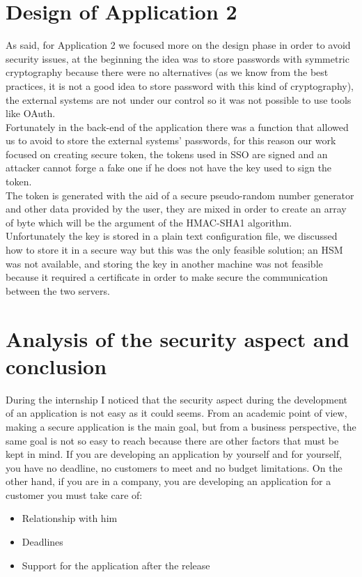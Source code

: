 \section{Design of Application 2}
As said, for Application 2 we focused more on the design phase in order to avoid security issues, at the beginning the idea was to
store passwords with symmetric cryptography because there were no alternatives (as we know from the best practices, it is not a good idea to store password with this kind of cryptography), the external systems are not under our control so
it was not possible to use tools like OAuth.\\
Fortunately in the back-end of the application there was a function that allowed us to avoid to store the external systems' passwords,
for this reason our work focused on creating secure token, the tokens used in SSO are signed and an attacker cannot forge a fake one
if he does not have the key used to sign the token.\\
The token is generated with the aid of a secure pseudo-random number generator and other data provided by the user, they are mixed in order to
create an array of byte which will be the argument of the HMAC-SHA1 algorithm.\\
Unfortunately the key is stored in a plain text configuration file, we discussed how to store it in a secure way but this was the only feasible
solution; an HSM was not available, and storing the key in another machine was not feasible because it required a certificate in order to
make secure the communication between the two servers.\\


\section{Analysis of the security aspect and conclusion}
During the internship I noticed that the security aspect during the development of an application is not easy as it could seems.\newline
From an academic point of view, making a secure application is the main goal, but from a business perspective, the same goal is not so easy to reach because there are other factors that must be kept in mind.\newline
If you are developing an application by yourself and for yourself, you have no deadline, no customers to meet and no budget limitations.\newline
On the other hand, if you are in a company, you are developing an application for a customer you must take care of:
\begin{itemize}
	\item Relationship with him
	\item Deadlines
	\item Support for the application after the release
\end{itemize}

